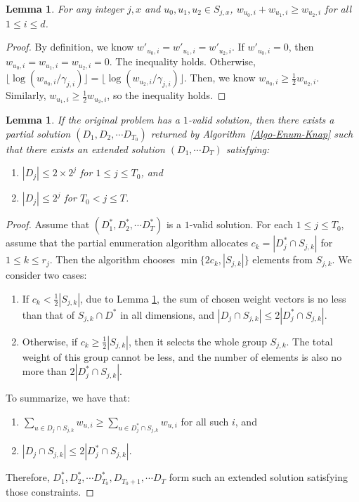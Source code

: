 \documentclass[11pt,a4paper]{article} \usepackage{enumitem}
\newtheorem{lemma}[theorem]{Lemma}
\theoremstyle{definition}
\begin{document}
\begin{lemma}\label{lem:Knap-Enum-Replace}
For any integer \(j, x\) and \(u_0, u_1, u_2 \in S_{j,x}\), \(w_{u_0,i} + w_{u_1,i} \ge w_{u_2,i}\) for all \(1 \le i \le d\). 
\end{lemma}
\begin{proof}
By definition, we know \(w'_{u_0,i} = w'_{u_1,i} = w'_{u_2,i}\). If \(w'_{u_0,i} = 0\), then \(w_{u_0,i} = w_{u_1,i} = w_{u_2,i} = 0\). The inequality holds. Otherwise, \(\lfloor \log(w_{u_0,i}/\gamma_{j,i}) \rfloor = \lfloor \log(w_{u_2,i}/\gamma_{j,i}) \rfloor\). Then, we know
\(w_{u_0,i} \ge \frac{1}{2} w_{u_2,i}\). Similarly, \(w_{u_1,i} \ge \frac{1}{2} w_{u_2,i}\), so the inequality holds.
\end{proof}

\begin{lemma}\label{lem:Knap-Enum-2}
If the original problem has a $1$-valid solution, then there exists a partial solution $(D_1, D_2, \cdots D_{T_0})$ returned by 
Algorithm~\ref{Algo-Enum-Knap} 
such that there exists an extended solution $(D_1, \cdots D_T)$ satisfying:
\begin{enumerate}
    \item $|D_j| \le 2 \times 2^j$ for $1 \le j \le T_0$, and 
    \item $|D_j| \le 2^j$ for $T_0 < j \le T$.
\end{enumerate}
\end{lemma}
\begin{proof}
Assume that $(D^{*}_1, D^{*}_2, \cdots D^{*}_T)$ is a $1$-valid solution. For each $1 \le j \le T_0$, assume that the partial enumeration algorithm allocates $c_k = |D^{*}_j \cap S_{j,k}|$ for $1\le k\le r_j$. Then 
the algorithm chooses $\min \{2c_k, |S_{j,k}|\}$ elements from 
$S_{j,k}$.
We consider two cases:

\begin{enumerate}
    \item If $c_k < \frac{1}{2} |S_{j,k}|$, due to Lemma \ref{lem:Knap-Enum-Replace}, the sum of chosen weight vectors is no less than that of $S_{j,k} \cap D^{*}$ in all dimensions, and $|D_j \cap S_{j,k}| \le 2|D^{*}_j \cap S_{j,k}|$.
    \item Otherwise, if $c_k \ge \frac{1}{2} |S_{j,k}|$, then it selects the whole group $S_{j,k}$. The total weight
    of this group cannot be less, and the number of elements is also no more than $2|D^{*}_j \cap S_{j,k}|$.
\end{enumerate}
To summarize, we have that:
\begin{enumerate}
    \item $\sum_{u \in D_j \cap S_{j,k}} w_{u,i} \ge \sum_{u \in D^{*}_j \cap S_{j,k}} w_{u,i}$ for all such $i$, and
    \item $|D_j \cap S_{j,k}| \le 2|D^{*}_j \cap S_{j,k}|$.
\end{enumerate}
Therefore, $D^{*}_1, D^{*}_2, \cdots D^{*}_{T_0}, D_{T_0+1}, \cdots D_T$ form such an extended solution satisfying those constraints.
\end{proof}
\end{document}
